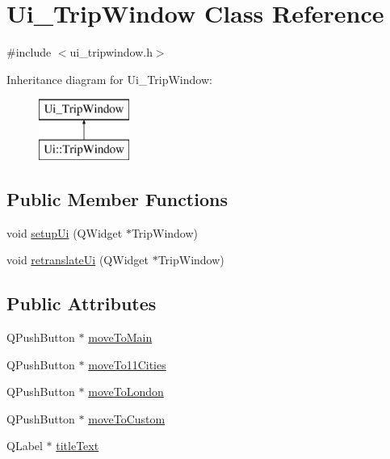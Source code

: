 \hypertarget{class_ui___trip_window}{}\section{Ui\+\_\+\+Trip\+Window Class Reference}
\label{class_ui___trip_window}


{\ttfamily \#include $<$ui\+\_\+tripwindow.\+h$>$}

Inheritance diagram for Ui\+\_\+\+Trip\+Window\+:\begin{figure}[H]
\begin{center}
\leavevmode
\includegraphics[height=2.000000cm]{class_ui___trip_window}
\end{center}
\end{figure}
\subsection*{Public Member Functions}
\begin{DoxyCompactItemize}
\item 
void \mbox{\hyperlink{class_ui___trip_window_a42dbbe827a8e59f90d532bc9febed469}{setup\+Ui}} (Q\+Widget $\ast$Trip\+Window)
\item 
void \mbox{\hyperlink{class_ui___trip_window_a9695983139e7fd78cee61c7a8b920bf8}{retranslate\+Ui}} (Q\+Widget $\ast$Trip\+Window)
\end{DoxyCompactItemize}
\subsection*{Public Attributes}
\begin{DoxyCompactItemize}
\item 
Q\+Push\+Button $\ast$ \mbox{\hyperlink{class_ui___trip_window_af9ed0863c361828932fa02423a503929}{move\+To\+Main}}
\item 
Q\+Push\+Button $\ast$ \mbox{\hyperlink{class_ui___trip_window_a19829ebaaefb4342ccde12cf00d2da70}{move\+To11\+Cities}}
\item 
Q\+Push\+Button $\ast$ \mbox{\hyperlink{class_ui___trip_window_aad7407aaada3011e791c80d36847bd71}{move\+To\+London}}
\item 
Q\+Push\+Button $\ast$ \mbox{\hyperlink{class_ui___trip_window_a405a6edc979b22f8745c2fa67e0f28ea}{move\+To\+Custom}}
\item 
Q\+Label $\ast$ \mbox{\hyperlink{class_ui___trip_window_a45b26400477d661fbb99a67999ac4035}{title\+Text}}
\end{DoxyCompactItemize}


